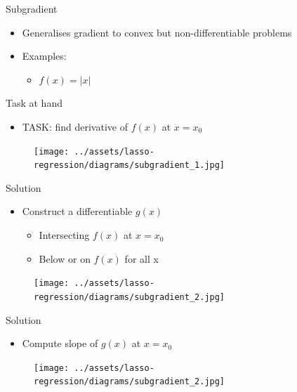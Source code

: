 \documentclass{beamer}
\begin{document}
\begin{frame}{Subgradient }
\begin{itemize}
	
	
	\item Generalises gradient to convex but non-differentiable problems
	\item Examples:
	\begin{itemize}
		\item $f(x) = |x|$
	\end{itemize}
	
\end{itemize}
\end{frame}

\begin{frame}{Task at hand}
\begin{itemize}

\item TASK: find derivative of $f(x)$ at $x = x_0$
\end{itemize}
\begin{figure}
\centering
\texttt{[image: ../assets/lasso-regression/diagrams/subgradient\_1.jpg]}

\label{fig:Non-differentiable function}
\end{figure}


\end{frame}

\begin{frame}{Solution}

\begin{itemize}
\item Construct a differentiable $g(x)$ 
\begin{itemize}
\item Intersecting $f(x)$ at $x = x_0$
\item Below or on $f(x)$ for all x
\end{itemize}
\end{itemize}
\begin{figure}
\centering
\texttt{[image: ../assets/lasso-regression/diagrams/subgradient\_2.jpg]}
\label{fig:my_label}
\end{figure}
\end{frame}

\begin{frame}{Solution}

\begin{itemize}
\item Compute slope of $g(x)$ at $x = x_0$
\end{itemize}
\begin{figure}
\centering
\texttt{[image: ../assets/lasso-regression/diagrams/subgradient\_2.jpg]}

\label{fig:my_label}
\end{figure}
\end{frame}
\end{document}
